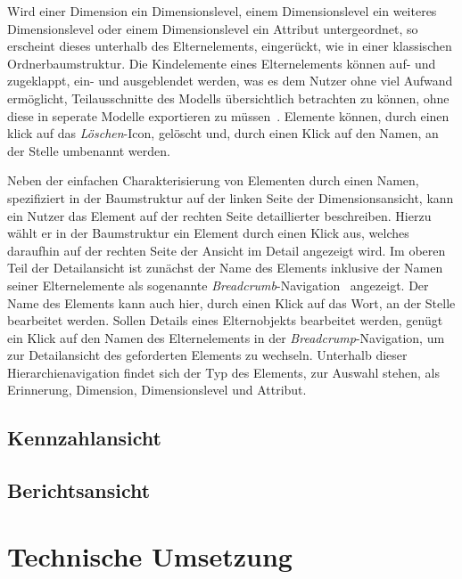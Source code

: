 \documentclass[
  language=german, %
  type=bachelor%
]{isthesis}
\begin{document}
\begin{content}
	Wird einer Dimension ein Dimensionslevel, einem
  Dimensionslevel ein weiteres Dimensionslevel oder einem Dimensionslevel ein
  Attribut untergeordnet, so erscheint dieses unterhalb des Elternelements,
  eingerückt, wie in einer klassischen Ordnerbaumstruktur. Die Kindelemente
  eines Elternelements können auf- und zugeklappt, \bzw{} ein- und ausgeblendet
  werden, was es dem Nutzer ohne viel Aufwand ermöglicht, Teilausschnitte des
  Modells übersichtlich betrachten zu können, ohne diese in seperate Modelle
  exportieren zu müssen~\cite[][S. 6 f.]{fleischer2013konstruktion}.  Elemente können, durch einen klick auf
  das \textit{Löschen}-Icon, gelöscht und, durch einen Klick auf den Namen, an
  der Stelle umbenannt werden.

	Neben der einfachen Charakterisierung von Elementen durch einen Namen,
	spezifiziert in der Baumstruktur auf der linken Seite der Dimensionsansicht,
	kann ein Nutzer das Element auf der rechten Seite detaillierter beschreiben.
	Hierzu wählt er in der Baumstruktur ein Element durch einen Klick aus,
	welches daraufhin auf der rechten Seite der Ansicht im Detail angezeigt
	wird. Im oberen Teil der Detailansicht ist zunächst der Name des Elements
	inklusive der Namen seiner Elternelemente als sogenannte
	\textit{Breadcrumb}-Navigation~\cite[][S. 1316]{maldonado2002common}
	angezeigt.  Der Name des Elements kann auch hier, durch einen Klick auf das
	Wort, an der Stelle bearbeitet werden. Sollen Details eines Elternobjekts
	bearbeitet werden, genügt ein Klick auf den Namen des Elternelements in der
	\textit{Breadcrump}-Navigation, um zur Detailansicht des geforderten Elements
	zu wechseln. Unterhalb dieser Hierarchienavigation findet sich der Typ des
	Elements, zur Auswahl stehen, als Erinnerung, Dimension, Dimensionslevel und
	Attribut.




  \subsection{Kennzahlansicht}
  \subsection{Berichtsansicht}


  \section{Technische Umsetzung}


\end{content}
\end{document}
